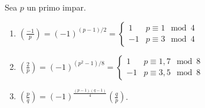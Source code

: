 \documentclass[CR.tex]{subfiles}
\begin{document}
\begin{teorema}
Sea $p$ un primo impar. %

\begin{enumerate}
\item $(\frac{-1}{p})=(-1)^{(p-1)/2}=\begin{cases}
1 & p\equiv 1\mod 4\\
-1 & p\equiv 3\mod 4
\end{cases}$ 
\item $(\frac{2}{p})=(-1)^{(p^2-1)/8}=\begin{cases}
1 & p\equiv 1,7\mod 8\\
-1 & p\equiv 3,5\mod 8
\end{cases}$
\item $(\frac{p}{q})=(-1)^{\frac{(p-1)(q-1)}{4}}(\frac{q}{p})$.
\end{enumerate}
\end{teorema}
\end{document}
